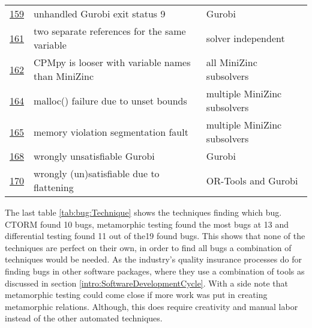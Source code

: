 \begin{table}[]
\begin{tabular}{lll}
		\href{https://github.com/CPMpy/cpmpy/issues/159}{159} & unhandled Gurobi exit status 9                    & Gurobi                       \\
		\href{https://github.com/CPMpy/cpmpy/issues/161}{161} & two separate references for the same variable     & solver independent           \\
		\href{https://github.com/CPMpy/cpmpy/issues/162}{162} & CPMpy is looser with variable names than MiniZinc & all MiniZinc subsolvers      \\
		\href{https://github.com/CPMpy/cpmpy/issues/164}{164} & malloc() failure due to unset bounds              & multiple MiniZinc subsolvers \\
		\href{https://github.com/CPMpy/cpmpy/issues/165}{165} & memory violation segmentation fault               & multiple MiniZinc subsolvers \\
		\href{https://github.com/CPMpy/cpmpy/issues/168}{168} & wrongly unsatisfiable Gurobi                      & Gurobi                       \\
		\href{https://github.com/CPMpy/cpmpy/issues/170}{170} & wrongly (un)satisfiable due to flattening         & OR-Tools and Gurobi          \\ \bottomrule
	\end{tabular}
\end{table}

\label{res:TechniqueToFindBug}
The last table \ref{tab:bug:Technique} shows the techniques finding which bug. CTORM found 10 bugs, metamorphic testing found the most bugs at 13 and differential testing found 11 out of the19 found bugs. This shows that none of the techniques are perfect on their own, in order to find all bugs a combination of techniques would be needed. As the industry's quality insurance processes do for finding bugs in other software packages, where they use a combination of tools as discussed in section \ref{intro:SoftwareDevelopmentCycle}. With a side note that metamorphic testing could come close if more work was put in creating metamorphic relations. Although, this does require creativity and manual labor instead of the other automated techniques.

